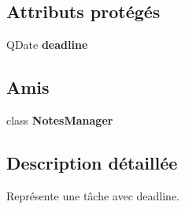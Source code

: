 \subsection*{Attributs protégés}
\begin{DoxyCompactItemize}
\item 
\hypertarget{class_tache_avec_deadline_a87c17be01a41bc30d625a68faecd25b2}{Q\-Date {\bfseries deadline}}\label{class_tache_avec_deadline_a87c17be01a41bc30d625a68faecd25b2}

\end{DoxyCompactItemize}
\subsection*{Amis}
\begin{DoxyCompactItemize}
\item 
\hypertarget{class_tache_avec_deadline_a017a5144e8cfa6087305055ab968ef41}{class {\bfseries Notes\-Manager}}\label{class_tache_avec_deadline_a017a5144e8cfa6087305055ab968ef41}

\end{DoxyCompactItemize}


\subsection{Description détaillée}
Représente une tâche avec deadline. 

